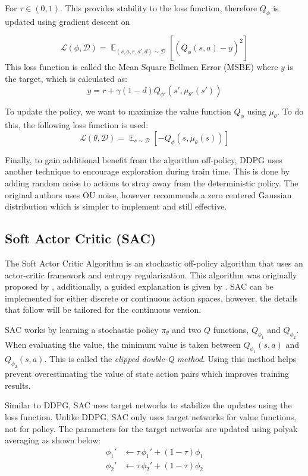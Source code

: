 \documentclass[conference]{IEEEtran}
\begin{document}
\begin{flushleft}
    For $\tau \in (0, 1)$. This provides stability to the loss function, therefore $Q_\phi$ is updated using gradient descent on
\end{flushleft}

$$
    \mathcal{L}(\phi, \mathcal{D}) = \mathop{\mathbb{E}}_{(s,a,r,s',d) \sim \mathcal{D}}\left[\left(Q_\phi(s,a) - y\right)^2\right]
$$
This loss function is called the Mean Square Bellmen Error (MSBE) where $y$ is the target, which is calculated as:
$$
    y = r + \gamma(1-d)Q_{\phi'}(s', \mu_{\theta'}(s'))
$$

To update the policy, we want to maximize the value function $Q_\phi$ using $\mu_\theta$. To do this, the following loss function is used:
$$
    \mathcal{L}(\theta, \mathcal{D}) = \mathop{\mathbb{E}}_{s \sim \mathcal{D}}\left[-Q_\phi(s, \mu_\theta(s))\right]
$$

Finally, to gain additional benefit from the algorithm off-policy, DDPG uses another technique to encourage exploration during train time. This is done by adding random noise to actions to stray away from the deterministic policy. The original authors uses OU noise, however \cite{spinning_up_ddpg} recommends a zero centered Gaussian distribution which is simpler to implement and still effective.

\subsection{Soft Actor Critic (SAC)}

The Soft Actor Critic Algorithm is an stochastic off-policy algorithm that uses an actor-critic framework and entropy regularization. This algorithm was originally proposed by \cite{SAC1, SAC2}, additionally, a guided explanation is given by \cite{spinning_up_sac}. SAC can be implemented for either discrete or continuous action spaces, however, the details that follow will be tailored for the continuous version.

SAC works by learning a stochastic policy $\pi_\theta$ and two $Q$ functions, $Q_{\phi_1}$ and $Q_{\phi_2}$.  When evaluating the value, the minimum value is taken between $Q_{\phi_1}(s, a)$ and $Q_{\phi_2}(s, a)$. This is called the \textit{clipped double-Q method}. Using this method helps prevent overestimating the value of state action pairs which improves training results.

Similar to DDPG, SAC uses target networks to stabilize the updates using the loss function. Unlike DDPG, SAC only uses target networks for value functions, not for policy. The parameters for the target networks are updated using polyak averaging as shown below:
\begin{align*}
    \phi_1' & \leftarrow \tau \, \phi_1' + (1 - \tau) \phi_1 \\
    \phi_2' & \leftarrow \tau \, \phi_2' + (1 - \tau) \phi_2
\end{align*}
\end{document}
